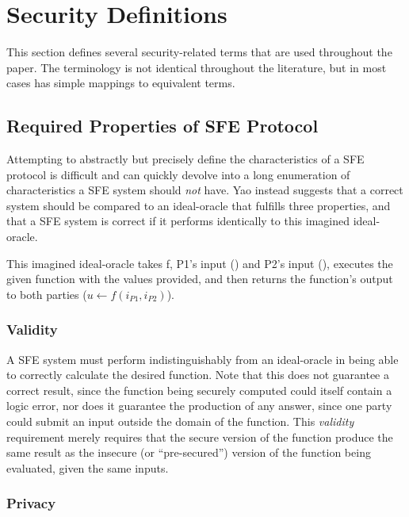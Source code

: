 \section{Security Definitions}
\label{sec:definitions}

This section defines several security-related terms that are used throughout the paper.  The terminology is not identical throughout the literature, but in most cases has simple mappings to equivalent terms.


\subsection{Required Properties of \ac{SFE} Protocol}

Attempting to abstractly but precisely define the characteristics of a \ac{SFE} protocol is difficult and can quickly devolve into a long enumeration of characteristics a \ac{SFE} system should \emph{not} have.  Yao instead suggests\cite{yao1986generate} that a correct system should be compared to an ideal-oracle that fulfills three properties, and that a \ac{SFE} system is correct if it performs identically to this imagined ideal-oracle.

This imagined ideal-oracle takes \ac{f}, \ac{P1}'s input (\ponein) and \ac{P2}'s input (\ptwoin), executes the given function with the values provided, and then returns the function's output to both parties ($u \leftarrow f(i_{P1}, i_{P2})$).


\subsubsection{Validity}

A \ac{SFE} system must perform indistinguishably from an ideal-oracle in being able to correctly calculate the desired function. Note that this does not guarantee a correct result, since the function being securely computed could itself contain a logic error, nor does it guarantee the production of any answer, since one party could submit an input outside the domain of the function. This \emph{validity} requirement merely requires that the secure version of the function produce the same result as the insecure (or ``pre-secured'') version of the function being evaluated, given the same inputs.


\subsubsection{Privacy}

